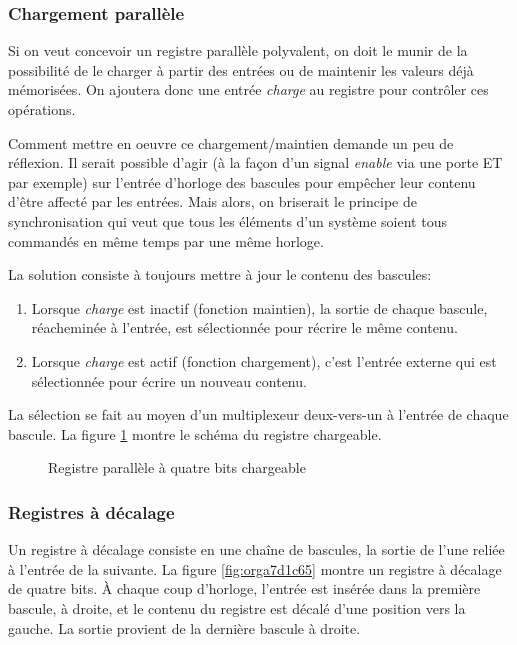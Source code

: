 \documentclass[11pt]{article}
\begin{document}
\subsubsection{Chargement parallèle}
\label{sec:org6d575fa}

Si on veut concevoir un registre parallèle polyvalent, on doit le
munir de la possibilité de le charger à partir des entrées ou de
maintenir les valeurs déjà mémorisées. On ajoutera donc une entrée
\emph{charge} au registre pour contrôler ces opérations.

Comment mettre en oeuvre ce chargement/maintien demande un peu de
réflexion. Il serait possible d'agir (à la façon d'un signal \emph{enable}
via une porte ET par exemple) sur l'entrée d'horloge des bascules
pour empêcher leur contenu d'être affecté par les entrées. Mais
alors, on briserait le principe de synchronisation qui veut que tous
les éléments d'un système soient tous commandés en même temps par une
même horloge.

La solution consiste à toujours mettre à jour le contenu des bascules: 

\begin{enumerate}
\item Lorsque \emph{charge} est inactif (fonction maintien), la sortie de
chaque bascule, réacheminée à l'entrée, est sélectionnée pour
récrire le même contenu.
\item Lorsque \emph{charge} est actif (fonction chargement), c'est l'entrée
externe qui est sélectionnée pour écrire un nouveau contenu.
\end{enumerate}

La sélection se fait au moyen d'un multiplexeur deux-vers-un à
l'entrée de chaque bascule. La figure \ref{fig:orgc218495} montre le schéma
du registre chargeable.

\begin{figure}[htbp]
\centering

\caption{\label{fig:orgc218495}Registre parallèle à quatre bits chargeable}
\end{figure}

\subsubsection{Registres à décalage}
\label{sec:orgf1a3d0b}

Un registre à décalage consiste en une chaîne de bascules, la sortie
de l'une reliée à l'entrée de la suivante. La figure \ref{fig:orga7d1c65} montre
un registre à décalage de quatre bits. À chaque coup d'horloge,
l'entrée est insérée dans la première bascule, à droite, et le contenu
du registre est décalé d'une position vers la gauche. La sortie
provient de la dernière bascule à droite.
\end{document}
